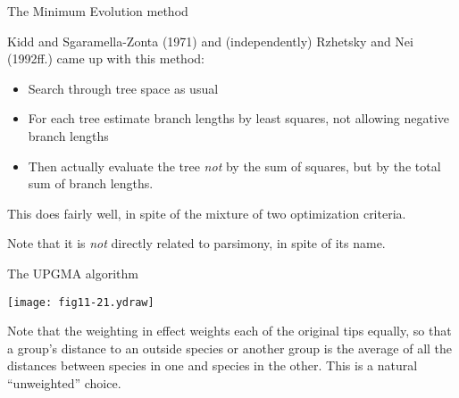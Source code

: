 \documentclass[bluish,slideColor,colorBG,pdf]{prosper}
\begin{document}
\begin{slide}[Replace]{The Minimum Evolution method}
\bigskip

Kidd and Sgaramella-Zonta (1971) and (independently) Rzhetsky and Nei (1992ff.)
came up with this method:

\begin{itemize}
\item Search through tree space as usual
\item For each tree estimate branch lengths by least squares, not allowing
negative branch lengths
\item Then actually evaluate the tree {\it not} by the sum of squares,
but by the total sum of branch lengths.
\end{itemize}

This does fairly well, in spite of the mixture of two optimization
criteria.
\bigskip

Note that it is {\it not} directly related to parsimony, in spite of its name.

\end{slide}

\begin{slide}[Replace]{The UPGMA algorithm}
\vspace{-0.2in}

\centerline{\texttt{[image: fig11-21.ydraw]}}

Note that the weighting in effect weights each of the original tips
equally, so that a group's distance to an outside species or another group
is the average of all the distances between species in one and species in
the other.  This is a natural ``unweighted'' choice.

\end{slide}
\end{document}
